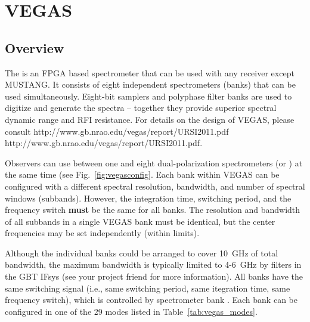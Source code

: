 \chapter{VEGAS}\label{chap:vegas}

\section{Overview}\label{sec:vegas_overview}

The  is an \gls{FPGA} based spectrometer that can be
used with any receiver except \gls{MUSTANG}. It consists of eight independent
spectrometers (banks) that can be used simultaneously. Eight-bit samplers and
polyphase filter banks are used to digitize and generate the spectra --
together they provide superior spectral dynamic range and \gls{RFI}
resistance. For details on the design of VEGAS, please consult
\htmladdnormallink
{http://www.gb.nrao.edu/vegas/report/URSI2011.pdf}
{http://www.gb.nrao.edu/vegas/report/URSI2011.pdf}.

Observers can use between one and eight dual-polarization spectrometers
(or ) at the same time (see Fig.~\ref{fig:vegasconfig}. Each bank
within VEGAS can be configured with a different spectral resolution,
bandwidth, and number of spectral windows (subbands). However, the integration
time, switching period, and the frequency switch {\bf must} be the same for
all banks. The resolution and bandwidth of all subbands in a single
VEGAS bank must be identical, but the center frequencies may be set
independently (within limits).

Although the individual banks could be arranged to cover 10~GHz
of total bandwidth, the maximum bandwidth is typically limited to 4-6~GHz
by filters in the \gls{GBT} \gls{IFsys} (see your project friend
for more information). All banks have the same switching signal
(i.e., same switching period, same itegration time, same frequency switch),
which is controlled by spectrometer bank . Each bank can be configured
in one of the 29 modes listed in Table~\ref{tab:vegas_modes}.


